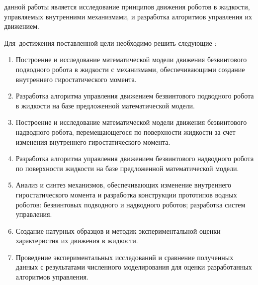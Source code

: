 {\aim} данной работы является исследование принципов движения роботов в жидкости, управляемых внутренними механизмами, и разработка алгоритмов управления их движением.

Для~достижения поставленной цели необходимо решить следующие {\tasks}:
\begin{enumerate}
  \item Построение и исследование математической модели движения безвинтового подводного робота в жидкости с механизмами, обеспечивающими создание внутреннего гиростатического момента.
  \item Разработка алгоритма управления движением безвинтового подводного робота в жидкости на базе предложенной математической модели.
  \item Построение и исследование математической модели движения безвинтового надводного робота, перемещающегося по поверхности жидкости за счет изменения внутреннего гиростатического момента.
  \item Разработка алгоритма управления движением безвинтового надводного робота по поверхности жидкости на базе предложенной математической модели.
  \item Анализ и синтез механизмов, обеспечивающих изменение внутреннего гиростатического момента и разработка конструкции прототипов водных роботов: безвинтовых подводного и надводного роботов; разработка систем управления.
  \item %
  Создание натурных образцов и методик экспериментальной оценки характеристик их движения в жидкости. %
  \item Проведение экспериментальных исследований и сравнение полученных данных с результатами численного моделирования для оценки разработанных алгоритмов управления.
\end{enumerate}


